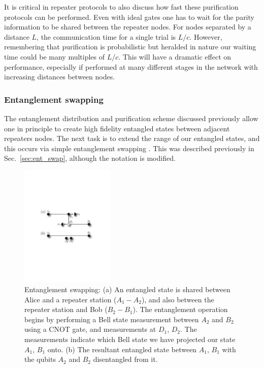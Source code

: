 \documentclass[twocolumn, aps, rmp, amsmath, amssymb, nofootinbib, superscriptaddress, longbibliography, floatfix, table-of-contents, eqsecnum]{revtex4-1}
\newcommand{\comment}[1]{{\color{blue}{\textbf{#1}}}}
\begin{document}
It is critical in repeater protocols to also discuss how fast these purification protocols can be performed. Even with ideal gates one has to wait for the parity information to be shared between the repeater nodes. For nodes separated by a distance $L$, the communication time for a single trial is $L/c$. However, remembering that purification is probabilistic but heralded in nature our waiting time could be many multiples of $L/c$. This will have a dramatic effect on performance, especially if performed at many different stages in the network with increasing distances between nodes.

\subsubsection{Entanglement swapping}\label{sec:reps_ent_swap}

The entanglement distribution and purification scheme discussed previously allow one in principle to create high fidelity entangled states between adjacent repeaters nodes. The next task is to extend the range of our entangled states, and this occurs via simple entanglement swapping \cite{BDCZ98, Zukowski93, goebel08, duan01}. This was described previously in Sec.~\ref{sec:ent_swap}, although the notation is modified.

\begin{figure}[!htb]
\includegraphics[width=0.4\textwidth]{repeaters_6}
\caption{\comment{Smaller labels, others too}Entanglement swapping: (a) An entangled state is shared between Alice and a repeater station ($A_1-A_2$), and also between the repeater station and Bob ($B_2-B_1$). The entanglement operation begins by performing a Bell state measurement between $A_2$ and $B_2$ using a CNOT gate, and measurements at $D_1$, $D_2$.  The measurements indicate which Bell state we have projected our state $A_1$, $B_1$ onto. (b) The resultant entangled state between $A_1$, $B_1$ with the qubits $A_2$ and $B_2$ disentangled from it.}
\label{fig:repeaters_6}
\end{figure} 
\end{document}

